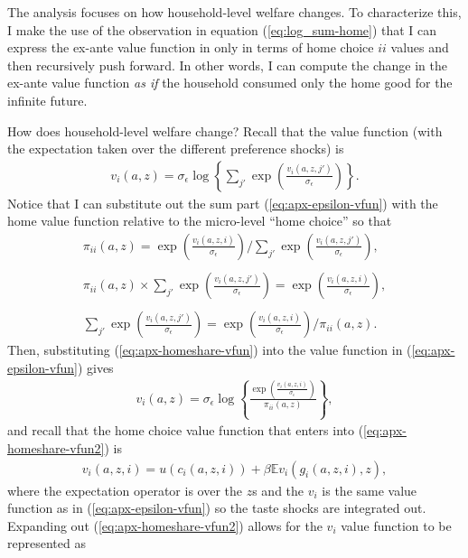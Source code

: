 \documentclass[12pt,pdftex]{article}
\begin{document}
\begin{onehalfspacing}
The analysis focuses on how household-level welfare changes. To characterize this, I make the use of the observation in equation (\ref{eq:log_sum-home}) that I can express the ex-ante value function in only in terms of home choice $ii$ values and then recursively push forward. In other words, I can compute the change in the ex-ante value function \emph{as if} the household consumed only the home good for the infinite future.

How does household-level welfare change? Recall that the value function (with the expectation taken over the different preference shocks) is
\begin{align}
v_i(a, z) =  \sigma_{\epsilon} \log \left\{ \sum_{j'} \exp \left( \frac{  v_{i}(a, z, j')}{\sigma_{\epsilon}} \right) \right\}.
\label{eq:apx-epsilon-vfun}
\end{align}
Notice that I can substitute out the sum part (\ref{eq:apx-epsilon-vfun}) with the home value function relative to the micro-level ``home choice'' so that
\begin{align}
\pi_{ii}(a, z) = \exp \left( \frac{ v_{i}(a, z, i) }{\sigma_{\epsilon}} \right) \Bigg / \sum_{j'} \exp \left( \frac{ v_{i}(a, z, j') }{\sigma_{\epsilon}} \right), \\
\nonumber \\
\pi_{ii}(a, z) \times \sum_{j'} \exp \left( \frac{ v_{i}(a, z, j') }{\sigma_{\epsilon}} \right) = \exp \left( \frac{ v_{i}(a, z, i) }{\sigma_{\epsilon}} \right), \\
\nonumber \\
\sum_{j'} \exp \left( \frac{ v_{i}(a, z, j') }{\sigma_{\epsilon}} \right) = \exp \left( \frac{ v_{i}(a, z, i) }{\sigma_{\epsilon}} \right) \Bigg / \pi_{ii}(a, z).
\label{eq:apx-homeshare-vfun}
\end{align}
Then, substituting (\ref{eq:apx-homeshare-vfun}) into the value function in (\ref{eq:apx-epsilon-vfun}) gives
\begin{align}
v_i(a, z) =  \sigma_{\epsilon} \log \left\{ \frac{ \exp \left( \frac{  v_{i}(a, z, i)}{\sigma_{\epsilon}}\right )}{\pi_{ii}(a,z)}  \right\},
\label{eq:apx-homeshare-vfun2}
\end{align}
and recall that the home choice value function that enters into (\ref{eq:apx-homeshare-vfun2}) is
\begin{align}
v_{i}(a, z, i) = u(c_{i}(a,z,i)) + \beta \mathbb{E} v_{i}(g_{i}(a,z,i),z),
\end{align}
where the expectation operator is over the $z$s and the $v_{i}$ is the same value function as in (\ref{eq:apx-epsilon-vfun}) so the taste shocks are integrated out. Expanding out (\ref{eq:apx-homeshare-vfun2}) allows for the $v_i$ value function to be represented as

\end{onehalfspacing}
\end{document}

